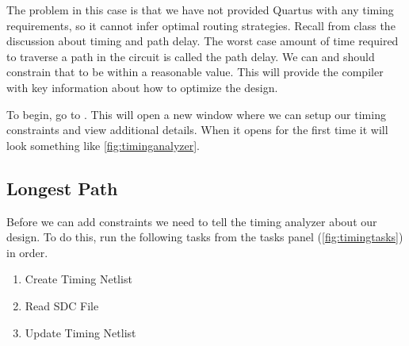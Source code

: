 \documentclass[12pt]{labmanual}
\begin{document}
The problem in this case is that we have not provided Quartus with any timing requirements, so it cannot infer optimal routing strategies. Recall from class the discussion about timing and path delay. The worst case amount of time required to traverse a path in the circuit is called the path delay. We can and should constrain that to be within a reasonable value. This will provide the compiler with key information about how to optimize the design.

To begin, go to . This will open a new window where we can setup our timing constraints and view additional details. When it opens for the first time it will look something like \autoref{fig:timinganalyzer}.
\subsection{Longest Path}
Before we can add constraints we need to tell the timing analyzer about our design. To do this, run the following tasks from the tasks panel (\autoref{fig:timingtasks}) in order.
\begin{enumerate}
    \item Create Timing Netlist
    \item Read SDC File
    \item Update Timing Netlist
\end{enumerate}
\end{document}

